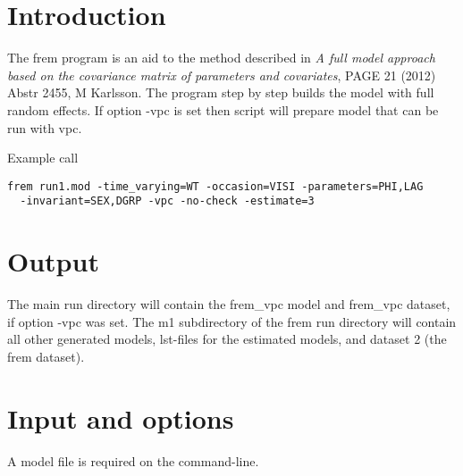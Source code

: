 



\maketitle


\section{Introduction}
The frem program is an aid to the method described in
\emph{A full model approach based on the covariance matrix of parameters and covariates},
PAGE 21 (2012) Abstr 2455, M Karlsson. 
The program step by step builds the model with full random effects.
If option -vpc is set then script will prepare model that can be run with vpc.

Example call
\begin{verbatim}
frem run1.mod -time_varying=WT -occasion=VISI -parameters=PHI,LAG 
  -invariant=SEX,DGRP -vpc -no-check -estimate=3
\end{verbatim}

\section{Output}
The main run directory will contain the frem\_vpc model and frem\_vpc dataset, if option -vpc was set.
The m1 subdirectory of the frem run directory will contain all other generated models, 
lst-files for the estimated models, and dataset 2 (the frem dataset). 

\section{Input and options}
A model file is required on the command-line.

